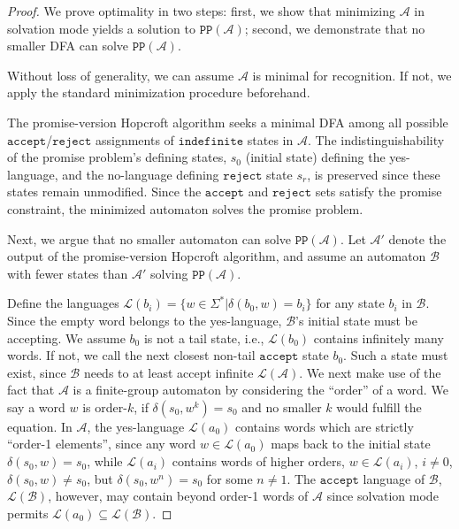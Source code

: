 \documentclass[../main.tex]{subfiles}
\begin{document}
\begin{proof}
    We prove optimality in two steps: first, we show that minimizing $\mathcal{A}$ in solvation mode yields a solution to $\mathtt{PP}(\mathcal{A})$; second, we demonstrate that no smaller DFA can solve $\mathtt{PP}(\mathcal{A})$.

    Without loss of generality,  we can assume $\mathcal{A}$ is minimal for recognition. If not, we apply the standard minimization procedure beforehand.

    The promise-version Hopcroft algorithm seeks a minimal DFA among all possible $\mathtt{accept}$/$\mathtt{reject}$  assignments of $\mathtt{indefinite}$ states in $\mathcal{A}$. The indistinguishability of the promise problem's defining states, $s_0$ (initial state) defining the yes-language, and the no-language defining $\mathtt{reject}$  state $s_r$, is preserved since these states remain unmodified. Since the $\mathtt{accept}$ and $\mathtt{reject}$  sets satisfy the promise constraint, the minimized automaton solves the promise problem.
    
    Next, we argue that no smaller automaton can solve $\mathtt{PP}(\mathcal{A})$. Let $\mathcal{A}'$ denote the output of the promise-version Hopcroft algorithm, and assume an automaton $\mathcal{B}$ with fewer states than $\mathcal{A}'$ solving $\mathtt{PP}(\mathcal{A})$.

    Define the languages $\mathcal{L}(b_i) = \{w \in \Sigma^* | \delta(b_0, w) = b_i \}$ for any state $b_i$ in $\mathcal{B}$. Since the empty word belongs to the yes-language, $\mathcal{B}$'s initial state must be accepting. We assume $b_0$ is not a tail state, i.e., $\mathcal{L}(b_0)$ contains infinitely many words. If not, we call the next closest non-tail $\mathtt{accept}$ state $b_0$. Such a state must exist, since $\mathcal{B}$ needs to at least accept infinite $\mathcal{L}(\mathcal{A})$.
    We next make use of the fact that $\mathcal{A}$ is a finite-group automaton by considering the ``order'' of a word. We say a word $w$ is order-$k$, if $\delta(s_0,w^k)=s_0$ and no smaller $k$ would fulfill the equation.
    In $\mathcal{A}$, the yes-language $\mathcal{L}(a_0)$ contains words which are strictly ``order-1 elements'', since any word $w \in \mathcal{L}(a_0)$ maps back to the initial state $\delta(s_0, w) = s_0$, while $\mathcal{L}(a_i)$ contains words of higher orders, $w \in \mathcal{L}(a_i)$, $i \neq 0$, $\delta(s_0, w) \neq s_0$, but $\delta(s_0, w^n) = s_0$ for some $n \neq 1$. The $\mathtt{accept}$ language of $\mathcal{B}$, $\mathcal{L}(\mathcal{B})$, however, may contain beyond order-1 words of $\mathcal{A}$ since solvation mode permits $\mathcal{L}(a_0) \subseteq \mathcal{L}(\mathcal{B})$.
    

\end{proof}
\end{document}
